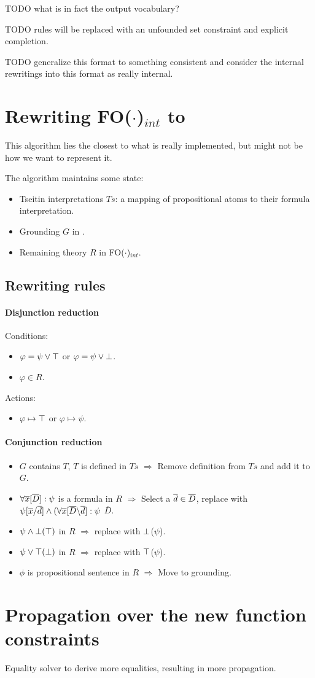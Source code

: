 \documentclass{article}
\newcommand{\indot}{{\sc FO($\cdot$)$_{int}$}\xspace}
\newcommand{\DDD}{\ensuremath{\overline{D}}}
\begin{document}
TODO what is in fact the output vocabulary?

TODO rules will be replaced with an unfounded set constraint and explicit completion.

TODO generalize this format to something consistent and consider the internal rewritings into this format as really internal.

\section{Rewriting \indot to \pcdot}
This algorithm lies the closest to what is really implemented, but might not be how we want to represent it.

The algorithm maintains some state:
\begin{itemize}
  \item Tseitin interpretations $Ts$: a mapping of propositional atoms to their formula interpretation.
	\item Grounding $G$ in \pcdot.
	\item Remaining theory $R$ in \indot.    
\end{itemize}

\subsection{Rewriting rules}
\paragraph{Disjunction reduction}
Conditions:
\begin{itemize}
  \item $\varphi=\psi \lor \top$ or $\varphi=\psi \lor \bot$.
  \item $\varphi \in R$.
\end{itemize}
Actions:
\begin{itemize}
  \item $\varphi \mapsto \top$ or $\varphi \mapsto \psi$.
\end{itemize}

\paragraph{Conjunction reduction}
\begin{itemize}
  \item $G$ contains $T$, $T$ is defined in $Ts$ $\Longrightarrow$ Remove definition from $Ts$ and add it to $G$.
  \item $\forall \xxx[\DDD]: \psi$ is a formula in $R$ $\Longrightarrow$ Select a $\ddd \in \DDD$, replace with $\psi[\xxx\subs\ddd] \land (\forall \xxx[\DDD\elim\ddd]: \psi$ $\DDD$. 
  \item $\psi \land \bot(\top)$ in $R$ $\Longrightarrow$ replace with $\bot$($\psi$).
  \item $\psi \lor \top(\bot)$ in $R$ $\Longrightarrow$ replace with $\top$($\psi$).
  \item $\phi$ is propositional sentence in $R$ $\Longrightarrow$ Move to grounding.
\end{itemize}

\section{Propagation over the new function constraints}
Equality solver to derive more equalities, resulting in more propagation.
\end{document}
